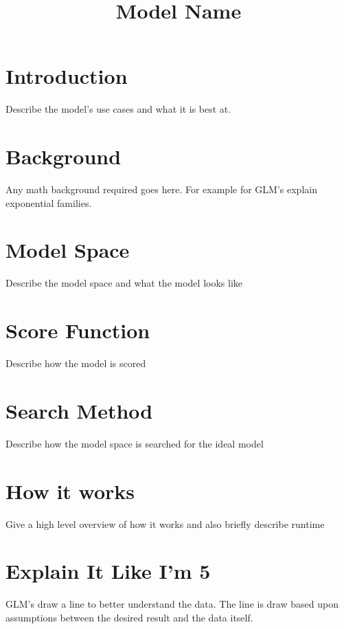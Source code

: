 \documentclass{article}
\title{Model Name}
\begin{document}
\maketitle

\section{Introduction}

Describe the model's use cases and what it is best at. 

\section{Background}

Any math background required goes here. For example for GLM's explain exponential families.

\section{Model Space}

Describe the model space and what the model looks like

\section{Score Function}

Describe how the model is scored


\section{Search Method}

Describe how the model space is searched for the ideal model

\section{How it works}

Give a high level overview of how it works and also briefly describe runtime

\section{Explain It Like I'm 5}

GLM's draw a line to better understand the data. The line is draw based upon assumptions between the desired result and the data itself.
\end{document}

